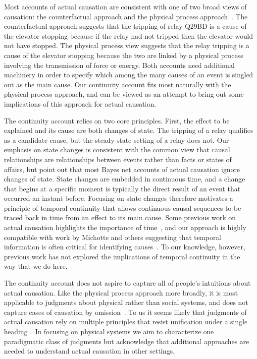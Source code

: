 \documentclass[10pt,letterpaper]{article}
\begin{document}
Most accounts of actual causation are consistent with one of two broad views of causation: the counterfactual approach and the physical process approach~\cite{hall04}. The counterfactual approach suggests that the tripping of relay Q29BD is a cause of the elevator stopping because if the relay had not tripped then the elevator would not have stopped. The physical process view suggests that the relay tripping is a cause of the elevator stopping because the two are linked by a physical process involving the transmission of force or energy.  Both accounts need additional machinery in order to specify which among the many causes of an event is singled out as the main cause. Our continuity account fits most naturally with the physical process approach, and can be viewed as an attempt to bring out some implications of this approach for actual causation. 

The continuity account relies on two core principles. First, the effect to be explained and its cause are both changes of state. The tripping of a relay qualifies as a candidate cause, but the steady-state setting of a relay does not. Our emphasis on state changes is consistent with the common view that causal relationships are relationships between events rather than facts or states of affairs, but   point out that most Bayes net accounts of actual causation ignore changes of state. State changes are embedded in continuous time, and a change that begins at a specific moment is typically the direct result of an event that occurred an instant before. Focusing on state changes therefore motivates a principle of temporal continuity that allows continuous causal sequences to be traced back in time from an effect to its main cause. Some previous work on actual causation highlights the importance of time~\cite{stephanmw20e}, and our approach is highly compatible with work by Michotte and others suggesting that temporal information is often critical for identifying causes~\cite{youngs09,davisbr20}.  To our knowledge, however,  previous work has not explored the implications of temporal continuity in the way that we do here.

The continuity account does not aspire to capture all of people's intuitions about actual causation. Like the physical process approach more broadly, it is most applicable to judgments about physical rather than social systems, and does not capture cases of causation by omission~\cite{wolffbh10}. To us it seems likely that judgments of actual causation rely on multiple principles that resist unification under a single heading~\cite{hall04,danks17}. In focusing on physical systems we aim to characterize one paradigmatic class of judgments but acknowledge that additional approaches are needed to understand actual causation in other settings.
\end{document}
